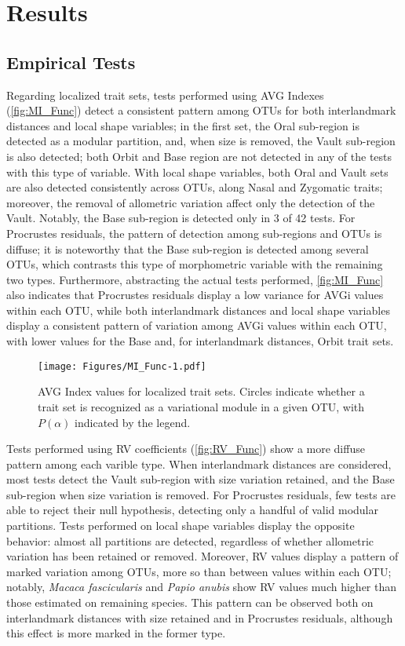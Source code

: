 \documentclass[11pt,twoside]{report}
\begin{document}
\section{Results}\label{results}

\subsection{Empirical Tests}\label{empirical-tests}

Regarding localized trait sets, tests performed using AVG Indexes
(\autoref{fig:MI_Func}) detect a consistent pattern among OTUs for both
interlandmark distances and local shape variables; in the first set, the
Oral sub-region is detected as a modular partition, and, when size is
removed, the Vault sub-region is also detected; both Orbit and Base
region are not detected in any of the tests with this type of variable.
With local shape variables, both Oral and Vault sets are also detected
consistently across OTUs, along Nasal and Zygomatic traits; moreover,
the removal of allometric variation affect only the detection of the
Vault. Notably, the Base sub-region is detected only in 3 of 42 tests.
For Procrustes residuals, the pattern of detection among sub-regions and
OTUs is diffuse; it is noteworthy that the Base sub-region is detected
among several OTUs, which contrasts this type of morphometric variable
with the remaining two types. Furthermore, abstracting the actual tests
performed, \autoref{fig:MI_Func} also indicates that Procrustes
residuals display a low variance for AVGi values within each OTU, while
both interlandmark distances and local shape variables display a
consistent pattern of variation among AVGi values within each OTU, with
lower values for the Base and, for interlandmark distances, Orbit trait
sets.

\begin{figure}[htbp]
\centering
\texttt{[image: Figures/MI\_Func-1.pdf]}
\caption{AVG Index values for localized trait sets. Circles indicate
whether a trait set is recognized as a variational module in a given
OTU, with $P(\alpha)$ indicated by the legend. \label{fig:MI_Func}}
\end{figure}

Tests performed using RV coefficients (\autoref{fig:RV_Func}) show a
more diffuse pattern among each varible type. When interlandmark
distances are considered, most tests detect the Vault sub-region with
size variation retained, and the Base sub-region when size variation is
removed. For Procrustes residuals, few tests are able to reject their
null hypothesis, detecting only a handful of valid modular partitions.
Tests performed on local shape variables display the opposite behavior:
almost all partitions are detected, regardless of whether allometric
variation has been retained or removed. Moreover, RV values display a
pattern of marked variation among OTUs, more so than between values
within each OTU; notably, \emph{Macaca fascicularis} and \emph{Papio
anubis} show RV values much higher than those estimated on remaining
species. This pattern can be observed both on interlandmark distances
with size retained and in Procrustes residuals, although this effect is
more marked in the former type.
\end{document}
